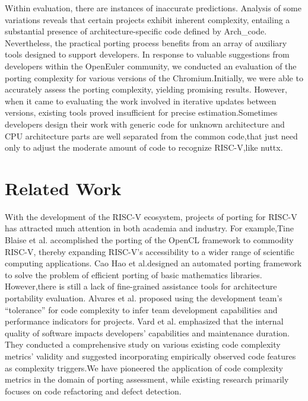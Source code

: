 \documentclass[sigconf,screen,review,anonymous]{acmart}
\begin{document}
Within evaluation, there are instances of inaccurate predictions. Analysis of some variations reveals that certain projects exhibit inherent complexity, entailing a substantial presence of architecture-specific code defined by Arch\_code.
Nevertheless, the practical porting process benefits from an array of auxiliary tools designed to support developers. In response to valuable suggestions from developers within the OpenEuler community, we conducted an evaluation of the porting complexity for various versions of the Chromium.Initially, we were able to accurately assess the porting complexity, yielding promising results. However, when it came to evaluating the work involved in iterative updates between versions, existing tools proved insufficient for precise estimation.Sometimes developers design their work with generic code for unknown architecture and CPU architecture parts are well separated from the common code,that just need only to adjust the moderate amount of code to recognize RISC-V,like nuttx.
\section{Related Work}
With the development of the RISC-V ecosystem,  projects of porting for RISC-V has attracted much attention in both academia and industry. For example,Tine Blaise et al.\cite{osti_1830102} accomplished the porting of the OpenCL framework to commodity RISC-V, thereby expanding RISC-V's accessibility to a wider range of scientific computing applications.
Cao Hao et al.\cite{2017Slow}designed an automated porting framework to solve the problem of efficient porting of basic mathematics libraries.
However,there is still a lack of fine-grained assistance tools for architecture portability evaluation.
Alvares et al. \cite{7844689} proposed using the development team's ``tolerance'' for code complexity to infer team development capabilities and performance indicators for projects.
Vard et al. \cite{2017Evaluating} emphasized that the internal quality of software impacts developers' capabilities and maintenance duration.
They conducted a comprehensive study on various existing code complexity metrics' validity and suggested incorporating empirically observed code features as complexity triggers.We have pioneered the application of code complexity metrics in the domain of porting assessment, while existing research primarily focuses on code refactoring and defect detection\cite{1993Software}.
\end{document}
